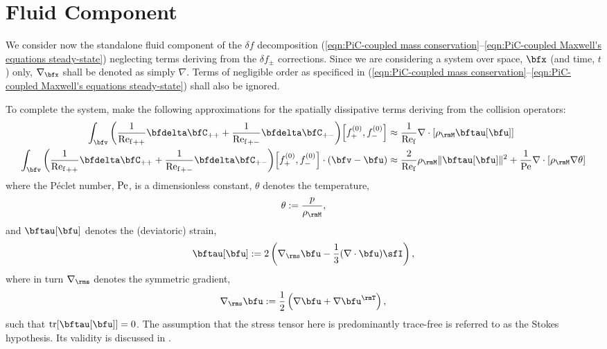 \chapter{Fluid Component}
    
    We consider now the standalone fluid component of the $\delta\!f$ decomposition (\ref{eqn:PiC-coupled mass conservation}--\ref{eqn:PiC-coupled Maxwell's equations steady-state}) neglecting terms deriving from the $\delta\!f_{\pm}$ corrections. Since we are considering a system over space, $\bfx$ (and time, $t$) only, $\nabla_{\bfx}$ shall be denoted as simply $\nabla$. Terms of negligible order as specificed in (\ref{eqn:PiC-coupled mass conservation}--\ref{eqn:PiC-coupled Maxwell's equations steady-state}) shall also be ignored.
    
    To complete the system, make the following approximations for the spatially dissipative terms deriving from the collision operators:
    \begin{align}
        \int_{\bfv}\left(\frac{1}{{\rmRef}_{++}}\bfdelta\bfC_{++} + \frac{1}{{\rmRef}_{+-}}\bfdelta\bfC_{+-}\right)\!\left[f_{+}^{(0)}, f_{-}^{(0)}\right]                    &\approx  \frac{1}{\rmRef}\nabla\cdot[\rho_{\rmM}\bftau[\bfu]]  \\
        \int_{\bfv}\left(\frac{1}{{\rmRef}_{++}}\bfdelta\bfC_{++} + \frac{1}{{\rmRef}_{+-}}\bfdelta\bfC_{+-}\right)\!\left[f_{+}^{(0)}, f_{-}^{(0)}\right]\cdot(\bfv - \bfu)  &\approx  \frac{2}{\rmRef}\rho_{\rmM}\|\bftau[\bfu]\|^{2} + \frac{1}{\rmPe}\nabla\cdot[\rho_{\rmM}\nabla\theta]
    \end{align}
    where the Péclet number, $\mathrm{Pe}$, is a dimensionless constant, $\theta$ denotes the temperature,
    \begin{equation}
        \theta  :=  \frac{p}{\rho_{\rmM}},
    \end{equation}
    and $\bftau[\bfu]$ denotes the (deviatoric) strain,
    \begin{equation}\label{eqn:strain equation}
        \bftau[\bfu]  :=  2\left(\nabla_{\rms}\bfu - \frac{1}{3}(\nabla\cdot\bfu)\sfI\right),
    \end{equation}
    where in turn $\nabla_{\rms}$ denotes the symmetric gradient,
    \begin{equation}
        \nabla_{\rms}\bfu  :=  \frac{1}{2}\left(\nabla\bfu + \nabla\bfu^{\rmT}\right),
    \end{equation}
    such that $\tr[\bftau[\bfu]]  =  0$. The assumption that the stress tensor here is predominantly trace-free is referred to as the Stokes hypothesis. \cite{Stokes_1845} Its validity is discussed in \cite{Vincenti_Kruger_1975}.

